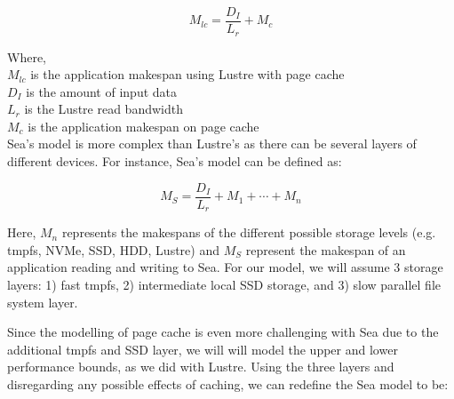       \begin{equation}\label{eq:sea-comp:lustrepc}
          M_{lc} = \frac{D_{I}}{L_{r}} + M_{c}
      \end{equation}

      Where, \\
      $M_{lc}$ is the application makespan using Lustre with page cache \\
      $D_{I}$ is the amount of input data \\
      $L_{r}$ is the Lustre read bandwidth \\
      $M_{c}$ is the application makespan on page cache \\



      Sea's model is more complex than Lustre's as there can be several layers
      of different devices. For instance, Sea's model can be defined as:

      \begin{equation}\label{eq:sea-comp:sea}
          M_{S} = \frac{D_{I}}{L_{r}} + M_{1} + \cdots + M_{n}
      \end{equation}

      Here, $M_{n}$ represents the makespans of the different possible storage
      levels (e.g. tmpfs, NVMe, SSD, HDD, Lustre) and $M_{S}$ represent the
      makespan of an application reading and writing to Sea. For our model, we
      will assume 3 storage layers: 1) fast tmpfs, 2) intermediate local SSD
      storage, and 3) slow parallel file system layer.

      Since the modelling of page cache is even more challenging with Sea due to
      the additional tmpfs and SSD layer, we will will model the upper and lower
      performance bounds, as we did with Lustre. Using the three layers and
      disregarding any possible effects of caching, we can redefine the Sea
      model to be:

